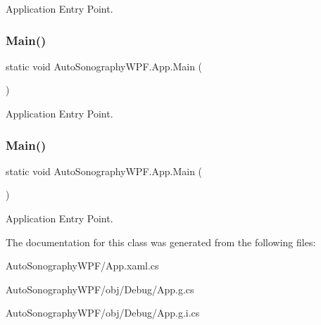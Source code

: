 Application Entry Point. 

\hypertarget{class_auto_sonography_w_p_f_1_1_app_a78f9df146a506989aad70cdf7863bd1e}{}\label{class_auto_sonography_w_p_f_1_1_app_a78f9df146a506989aad70cdf7863bd1e} 
\subsubsection{\texorpdfstring{Main()}{Main()}\hspace{0.1cm}{\footnotesize\ttfamily [3/4]}}
{\footnotesize\ttfamily static void Auto\+Sonography\+W\+P\+F.\+App.\+Main (\begin{DoxyParamCaption}{ }\end{DoxyParamCaption})\hspace{0.3cm}{\ttfamily [static]}}



Application Entry Point. 

\hypertarget{class_auto_sonography_w_p_f_1_1_app_a78f9df146a506989aad70cdf7863bd1e}{}\label{class_auto_sonography_w_p_f_1_1_app_a78f9df146a506989aad70cdf7863bd1e} 
\subsubsection{\texorpdfstring{Main()}{Main()}\hspace{0.1cm}{\footnotesize\ttfamily [4/4]}}
{\footnotesize\ttfamily static void Auto\+Sonography\+W\+P\+F.\+App.\+Main (\begin{DoxyParamCaption}{ }\end{DoxyParamCaption})\hspace{0.3cm}{\ttfamily [static]}}



Application Entry Point. 



The documentation for this class was generated from the following files\+:\begin{DoxyCompactItemize}
\item 
Auto\+Sonography\+W\+P\+F/App.\+xaml.\+cs\item 
Auto\+Sonography\+W\+P\+F/obj/\+Debug/App.\+g.\+cs\item 
Auto\+Sonography\+W\+P\+F/obj/\+Debug/App.\+g.\+i.\+cs\end{DoxyCompactItemize}

